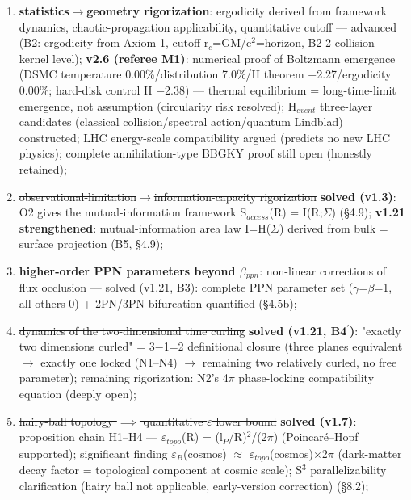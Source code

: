 \documentclass[12pt]{article}
\newcommand{\up}[1]{\ensuremath{^{#1}}}
\newcommand{\down}[1]{\ensuremath{_{#1}}}
\begin{document}
\begin{enumerate}
\item \textbf{statistics\ensuremath{\to}geometry rigorization}: ergodicity derived from framework dynamics, chaotic-propagation applicability, quantitative cutoff --- \checkmark advanced (B2: ergodicity from Axiom 1, cutoff r\down{c}=GM/c\up{2}=horizon, B2-2 collision-kernel level); \textbf{v2.6 (referee M1)}: numerical proof of Boltzmann emergence (DSMC temperature 0.00\%/distribution 7.0\%/H theorem \ensuremath{-}2.27/ergodicity 0.00\%; hard-disk control H \ensuremath{-}2.38) --- thermal equilibrium = long-time-limit emergence, not assumption (circularity risk resolved); H\down{event} three-layer candidates (classical collision/spectral action/quantum Lindblad) constructed; LHC energy-scale compatibility argued (predicts no new LHC physics); complete annihilation-type BBGKY proof still open (honestly retained);
\item \sout{observational-limitation\ensuremath{\to}information-capacity rigorization} \textbf{\checkmark solved (v1.3)}: O2 gives the mutual-information framework S\down{access}(R) = I(R;\ensuremath{\Sigma}) (\S{}4.9); \textbf{v1.21 strengthened}: mutual-information area law I=H(\ensuremath{\Sigma}) derived from bulk = surface projection (B5, \S{}4.9);
\item \textbf{higher-order PPN parameters beyond \ensuremath{\beta}\down{ppn}}: non-linear corrections of flux occlusion --- \checkmark solved (v1.21, B3): complete PPN parameter set (\ensuremath{\gamma}=\ensuremath{\beta}=1, all others 0) + 2PN/3PN bifurcation quantified (\S{}4.5b);
\item \sout{dynamics of the two-dimensional time curling} \textbf{\checkmark solved (v1.21, B4\ensuremath{^\prime})}: "exactly two dimensions curled" = 3\ensuremath{-}1=2 definitional closure (three planes equivalent \ensuremath{\to} exactly one locked (N1--N4) \ensuremath{\to} remaining two relatively curled, no free parameter); remaining rigorization: N2's 4\ensuremath{\pi} phase-locking compatibility equation (deeply open);
\item \sout{hairy-ball topology \ensuremath{\implies} quantitative \ensuremath{\varepsilon} lower bound} \textbf{\checkmark solved (v1.7)}: proposition chain H1--H4 --- \ensuremath{\varepsilon}\down{topo}(R) = (l\down{P}/R)\up{2}/(2\ensuremath{\pi}) (Poincar\'{e}--Hopf supported); significant finding \ensuremath{\varepsilon}\down{B}(cosmos) \ensuremath{\approx} \ensuremath{\varepsilon}\down{topo}(cosmos)\ensuremath{\times}2\ensuremath{\pi} (dark-matter decay factor = topological component at cosmic scale); S\up{3} parallelizability clarification (hairy ball not applicable, early-version correction) (\S{}8.2);

\end{enumerate}
\end{document}
